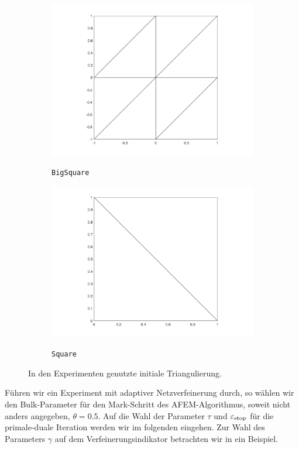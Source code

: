 \begin{figure}[!ht]
  \centering
  \begin{subfigure}[b]{.48\linewidth}
    \caption{\texttt{BigSquare}}
    \includegraphics[trim = 90 30 90 20, clip, width=\linewidth]
      {pictures/chapExperiments/secGeneralInfo/bigSquareTriang.png}
    \label{fig:triangBigSquare}
  \end{subfigure}
  \quad
  \begin{subfigure}[b]{.48\linewidth}
    \caption{\texttt{Square}}
    \includegraphics[trim = 90 30 90 20, clip, width=\linewidth]
      {pictures/chapExperiments/secGeneralInfo/squareTriang.png}
    \label{fig:triangSquare}
  \end{subfigure}
  \caption{In den Experimenten genutzte initiale Triangulierung.}
  \label{fig:initialTriangulations}
\end{figure}
Führen wir ein Experiment mit adaptiver Netzverfeinerung durch, so wählen wir
den Bulk-Parameter für den Mark-Schritt des AFEM-Algorithmus, soweit nicht
anders angegeben, $\theta=0.5$.
Auf die Wahl der Parameter $\tau$ und $\varepsilon_{\textup{stop}}$ für die primale-duale
Iteration werden wir im folgenden  eingehen.
Zur Wahl des Parameters $\gamma$ auf dem Verfeinerungsindikator betrachten
wir in  ein Beispiel.

